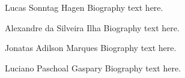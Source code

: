 \begin{IEEEbiographynophoto}{Lucas Sonntag Hagen}
Biography text here.
\end{IEEEbiographynophoto}

\begin{IEEEbiographynophoto}{Alexandre da Silveira Ilha}
Biography text here.
\end{IEEEbiographynophoto}

\begin{IEEEbiographynophoto}{Jonatas Adilson Marques}
Biography text here.
\end{IEEEbiographynophoto}

\begin{IEEEbiographynophoto}{Luciano Paschoal Gaspary}
Biography text here.
\end{IEEEbiographynophoto}